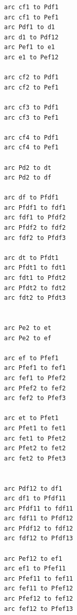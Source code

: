 \begin{figure}[ht]
\begin{small}
\begin{verbatim}
arc cf1 to Pdf1
arc cf1 to Pef1
arc Pdf1 to d1
arc d1 to Pdf12
arc Pef1 to e1
arc e1 to Pef12

arc cf2 to Pdf1
arc cf2 to Pef1

arc cf3 to Pdf1
arc cf3 to Pef1

arc cf4 to Pdf1
arc cf4 to Pef1

arc Pd2 to dt
arc Pd2 to df

arc df to Pfdf1
arc Pfdf1 to fdf1
arc fdf1 to Pfdf2
arc Pfdf2 to fdf2
arc fdf2 to Pfdf3

arc dt to Pfdt1
arc Pfdt1 to fdt1
arc fdt1 to Pfdt2
arc Pfdt2 to fdt2
arc fdt2 to Pfdt3


arc Pe2 to et
arc Pe2 to ef

arc ef to Pfef1
arc Pfef1 to fef1
arc fef1 to Pfef2
arc Pfef2 to fef2
arc fef2 to Pfef3

arc et to Pfet1
arc Pfet1 to fet1
arc fet1 to Pfet2
arc Pfet2 to fet2
arc fet2 to Pfet3


arc Pdf12 to df1
arc df1 to Pfdf11
arc Pfdf11 to fdf11
arc fdf11 to Pfdf12
arc Pfdf12 to fdf12
arc fdf12 to Pfdf13

arc Pef12 to ef1
arc ef1 to Pfef11
arc Pfef11 to fef11
arc fef11 to Pfef12
arc Pfef12 to fef12
arc fef12 to Pfef13
\end{verbatim}
\end{small}
\end{figure}

